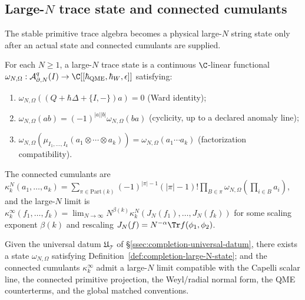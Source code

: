 \subsection{\texorpdfstring{Large-\(N\) trace state and connected cumulants}{Large-N trace state and connected cumulants}}
\label{ssec:completion-large-N}

The stable primitive trace algebra becomes a physical large-\(N\)
string state only after an actual state and connected cumulants are supplied.

\begin{defn}
\label{def:completion-large-N-state}
For each \(N\ge 1\), a large-\(N\) trace state is a continuous
\(\C\)-linear functional
\(\omega_{N,\Omega}:\mathcal A^q_{\partial,N}(I)\to\C[[\hbar_{\mathrm{QME}},
\hbar_W,\epsilon]]\) satisfying:
\begin{enumerate}
\item \(\omega_{N,\Omega}((Q+\hbar\Delta+\{I,-\})a)=0\)
  (Ward identity);
\item \(\omega_{N,\Omega}(ab)=(-1)^{|a||b|}\omega_{N,\Omega}(ba)\)
  (cyclicity, up to a declared anomaly line);
\item
  \(\omega_{N,\Omega}(\mu_{I_1,\ldots,I_k}(a_1\otimes\cdots\otimes a_k))
   =\omega_{N,\Omega}(a_1\cdots a_k)\)
  (factorization compatibility).
\end{enumerate}
The connected cumulants are
\(\kappa^N_k(a_1,\ldots,a_k)=\sum_{\pi\in\mathrm{Part}(k)}
(-1)^{|\pi|-1}(|\pi|-1)!\prod_{B\in\pi}\omega_{N,\Omega}
(\prod_{i\in B}a_i)\), and the large-\(N\) limit is
\(\kappa^\infty_k(f_1,\ldots,f_k)=\lim_{N\to\infty}N^{\beta(k)}
\kappa^N_k(J_N(f_1),\ldots,J_N(f_k))\) for some scaling exponent
\(\beta(k)\) and rescaling \(J_N(f)=N^{-\alpha}\Tr f(\phi_1,\phi_2)\).
\end{defn}

\begin{thm}
\label{thm:completion-large-N}
Given the universal datum \(\mathfrak U_{\mathcal T}\) of
\S\ref{ssec:completion-universal-datum}, there exists a state
\(\omega_{N,\Omega}\) satisfying
Definition~\ref{def:completion-large-N-state}; and the connected
cumulants \(\kappa^\infty_k\) admit a large-\(N\) limit compatible
with the Capelli scalar line, the connected primitive projection,
the Weyl/radial normal form, the QME counterterms, and the global
matched conventions.
\end{thm}

